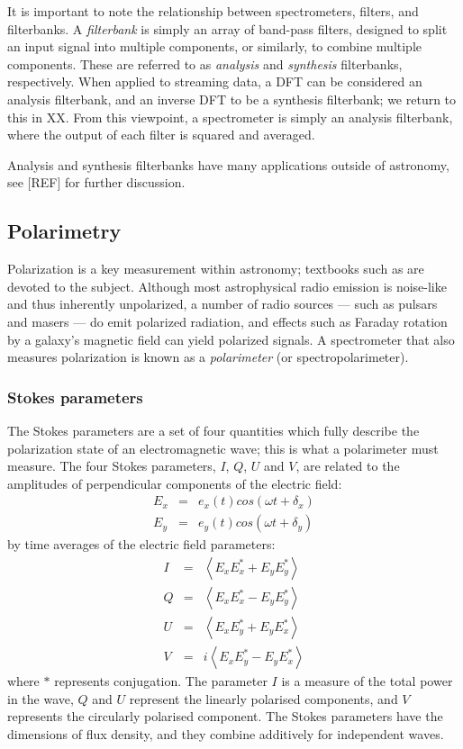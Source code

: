 \documentclass{ws-rv961x669}
\begin{document}
It is important to note the relationship between spectrometers, filters, and filterbanks. A \emph{filterbank} is simply an array of band-pass filters, designed to split an input signal into multiple components, or similarly, to combine multiple components. These are referred to as \emph{analysis} and \emph{synthesis} filterbanks, respectively. When applied to streaming data, a DFT can be considered an analysis filterbank, and an inverse DFT to be a synthesis filterbank; we return to this in XX. From this viewpoint, a spectrometer is simply an analysis filterbank, where the output of each filter is squared and averaged.

Analysis and synthesis filterbanks have many applications outside of astronomy, see [REF] for further discussion.

\subsection{Polarimetry}

Polarization is a key measurement within astronomy; textbooks such as \citet{BookTinbergenPolarim} are devoted to the subject.  Although most astrophysical radio emission is noise-like and thus inherently unpolarized, a number of radio sources --- such as pulsars and masers --- do emit polarized radiation, and effects such as Faraday rotation by a galaxy's magnetic field can yield polarized signals. A spectrometer that also measures polarization is known as a \emph{polarimeter} (or spectropolarimeter).

\subsubsection{Stokes parameters}

The Stokes parameters are a set of four quantities which fully describe the polarization state of an electromagnetic wave; this is what a polarimeter must measure. The four Stokes parameters, $I$, $Q$, $U$ and $V$, are related to the amplitudes of perpendicular components of the electric field:
\begin{eqnarray}
E_{x} & = & e_{x}(t)cos(\omega t+\delta_{x})\\
E_{y} & = & e_{y}(t)cos(\omega t+\delta_{y})
\end{eqnarray}
by time averages of the electric field parameters:
\begin{eqnarray}
I & = & \left\langle E_{x}E_{x}^{*}+E_{y}E_{y}^{*}\right\rangle \\
Q & = & \left\langle E_{x}E_{x}^{*}-E_{y}E_{y}^{*}\right\rangle \\
U & = & \left\langle E_{x}E_{y}^{*}+E_{y}E_{x}^{*}\right\rangle \\
V & = & i\left\langle E_{x}E_{y}^{*}-E_{y}E_{x}^{*}\right\rangle 
\end{eqnarray}
where $*$ represents conjugation. The parameter $I$ is a measure of the total power in the wave, $Q$ and $U$ represent the linearly polarised components, and $V$ represents the circularly polarised component. The Stokes parameters have the dimensions of flux density, and they combine additively for independent waves.
\end{document}

